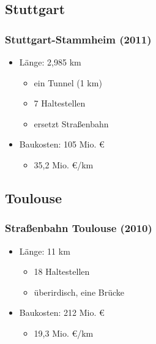 \documentclass[xcolor=dvipsnames]{beamer}
\begin{document}

\subsection{Stuttgart}
\begin{frame}
  \frametitle{Stuttgart-Stammheim (2011)}

  \begin{itemize}
  \item Länge: 2,985 km
    \begin{itemize}
    \item ein Tunnel (1 km)
    \item 7 Haltestellen
    \item ersetzt Straßenbahn
    \end{itemize}
  \item Baukosten: 105 Mio. €
    \begin{itemize}
    \item 35,2 Mio. €/km
    \end{itemize}
  \end{itemize}
\end{frame}


\subsection{Toulouse}
\begin{frame}
  \frametitle{Straßenbahn Toulouse (2010)}

  \begin{itemize}
  \item Länge: 11 km
    \begin{itemize}
    \item 18 Haltestellen
    \item überirdisch, eine Brücke
    \end{itemize}
  \item Baukosten: 212 Mio. €
    \begin{itemize}
    \item 19,3 Mio. €/km
    \end{itemize}
  \end{itemize}
\end{frame}

\end{document}
